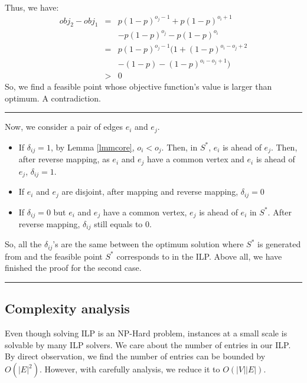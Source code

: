 \documentclass[letterpaper]{article}
\newenvironment{proof}{{Proof:}}{\hfill\rule{2mm}{2mm}}
\begin{document}
\begin{proof}
\begin{proof}
\begin{eqnarray}
		\end{eqnarray} 
		Thus, we have:
		\begin{eqnarray}
		obj_2-obj_1&=& p(1-p)^{o_j-1}+p(1-p)^{o_i+1}\nonumber\\&&-p(1-p)^{o_j}-p(1-p)^{o_i}\nonumber\\
		&=& p(1-p)^{o_j-1}(1+(1-p)^{o_i-o_j+2}\nonumber\\&& -(1-p)-(1-p)^{o_i-o_j+1})\nonumber\\
		&>& 0\nonumber
		\end{eqnarray}
		So, we find a feasible point whose objective function's value is larger than optimum.
		A contradiction.
	\end{proof}
	Now, we consider a pair of edges $e_i$ and $e_j$. 
	\begin{itemize}
		\item If $\delta_{ij}=1$, by Lemma \ref{lmmcore}, $o_i<o_j$. 
		Then, in $S^*$, $e_i$ is ahead of $e_j$.
		Then, after reverse mapping, as $e_i$ and $e_j$ have a common vertex and $e_i$ is ahead of $e_j$, $\delta_{ij}=1$.
		\item If $e_i$ and $e_j$ are disjoint, after mapping and reverse mapping, $\delta_{ij}=0$
		\item If $\delta_{ij}=0$ but $e_i$ and $e_j$ have a common vertex, $e_j$ is ahead of $e_i$ in $S^*$.
		After reverse mapping, $\delta_{ij}$ still equals to 0.
	\end{itemize}
	So, all the $\delta_{ij}$'s are the same between the optimum solution where $S^*$ is generated from and the feasible point $S^*$ corresponds to in the ILP.
	Above all, we have finished the proof for the second case. 
\end{proof}

\subsection{Complexity analysis}

Even though solving ILP is an NP-Hard problem, instances at a small scale is solvable by many ILP solvers.
We care about the number of entries in our ILP.
By direct observation, we find the number of entries can be bounded by $O(|E|^2)$.
However, with carefully analysis, we reduce it to $O(|V||E|)$.
\end{document}

